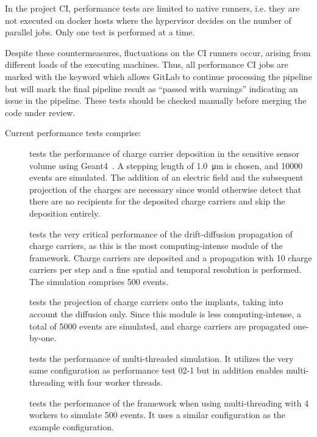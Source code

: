 In the project CI, performance tests are limited to native runners, i.e. they are not executed on docker hosts where the hypervisor decides on the number of parallel jobs.
Only one test is performed at a time.

Despite these countermeasures, fluctuations on the CI runners occur, arising from different loads of the executing machines.
Thus, all performance CI jobs are marked with the  keyword which allows GitLab to continue processing the pipeline but will mark the final pipeline result as ``passed with warnings'' indicating an issue in the pipeline.
These tests should be checked manually before merging the code under review.

Current performance tests comprise:

\begin{description}
    \item[] tests the performance of charge carrier deposition in the sensitive sensor volume using Geant4~\cite{geant4}. A stepping length of \SI{1.0}{\um} is chosen, and \num{10000} events are simulated. The addition of an electric field and the subsequent projection of the charges are necessary since \apsq would otherwise detect that there are no recipients for the deposited charge carriers and skip the deposition entirely.
    \item[] tests the very critical performance of the drift-diffusion propagation of charge carriers, as this is the most computing-intense module of the framework. Charge carriers are deposited and a propagation with 10 charge carriers per step and a fine spatial and temporal resolution is performed. The simulation comprises \num{500} events.
    \item[] tests the projection of charge carriers onto the implants, taking into account the diffusion only. Since this module is less computing-intense, a total of \num{5000} events are simulated, and charge carriers are propagated one-by-one.
    \item[] tests the performance of multi-threaded simulation. It utilizes the very same configuration as performance test 02-1 but in addition enables multi-threading with four worker threads.
    \item[] tests the performance of the framework when using multi-threading with 4 workers to simulate \num{500} events. It uses a similar configuration as the example configuration.
\end{description}
